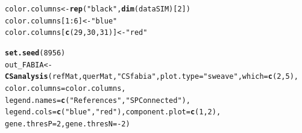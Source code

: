 \documentclass[a4paper]{article}\usepackage[]{graphicx}\usepackage[]{color}
\makeatletter
\newcommand{\hlnum}[1]{\textcolor[rgb]{0.686,0.059,0.569}{#1}}%
\newcommand{\hlstr}[1]{\textcolor[rgb]{0.192,0.494,0.8}{#1}}%
\newcommand{\hlopt}[1]{\textcolor[rgb]{0,0,0}{#1}}%
\newcommand{\hlstd}[1]{\textcolor[rgb]{0.345,0.345,0.345}{#1}}%
\newcommand{\hlkwb}[1]{\textcolor[rgb]{0.69,0.353,0.396}{#1}}%
\newcommand{\hlkwc}[1]{\textcolor[rgb]{0.333,0.667,0.333}{#1}}%
\newcommand{\hlkwd}[1]{\textcolor[rgb]{0.737,0.353,0.396}{\textbf{#1}}}%
\newenvironment{kframe}{%
 \def\at@end@of@kframe{}%
 \ifinner\ifhmode%
  \def\at@end@of@kframe{\end{minipage}}%
  \begin{minipage}{\columnwidth}%
 \fi\fi%
 \def\FrameCommand##1{\hskip\@totalleftmargin \hskip-\fboxsep
 \colorbox{shadecolor}{##1}\hskip-\fboxsep
     \hskip-\linewidth \hskip-\@totalleftmargin \hskip\columnwidth}%
 \MakeFramed {\advance\hsize-\width
   \@totalleftmargin\z@ \linewidth\hsize
   \@setminipage}}%
 {\par\unskip\endMakeFramed%
 \at@end@of@kframe}
\newenvironment{knitrout}{}{} %
\makeatother
\begin{document}
\begin{knitrout}
\color{fgcolor}\begin{kframe}
\begin{alltt}
        \hlstd{color.columns} \hlkwb{<-} \hlkwd{rep}\hlstd{(}\hlstr{"black"}\hlstd{,}\hlkwd{dim}\hlstd{(dataSIM)[}\hlnum{2}\hlstd{])}
        \hlstd{color.columns[}\hlnum{1}\hlopt{:}\hlnum{6}\hlstd{]} \hlkwb{<-} \hlstr{"blue"}
        \hlstd{color.columns[}\hlkwd{c}\hlstd{(}\hlnum{29}\hlstd{,}\hlnum{30}\hlstd{,}\hlnum{31}\hlstd{)]} \hlkwb{<-} \hlstr{"red"}

        \hlkwd{set.seed}\hlstd{(}\hlnum{8956}\hlstd{)}
        \hlstd{out_FABIA} \hlkwb{<-} \hlkwd{CSanalysis}\hlstd{(refMat,querMat,}\hlstr{"CSfabia"}\hlstd{,}\hlkwc{plot.type}\hlstd{=}\hlstr{"sweave"}\hlstd{,}\hlkwc{which}\hlstd{=}\hlkwd{c}\hlstd{(}\hlnum{2}\hlstd{,}\hlnum{5}\hlstd{),}
                        \hlkwc{color.columns}\hlstd{=color.columns,}
                        \hlkwc{legend.names}\hlstd{=}\hlkwd{c}\hlstd{(}\hlstr{"References"}\hlstd{,}\hlstr{"SP Connected"}\hlstd{),}
                        \hlkwc{legend.cols}\hlstd{=}\hlkwd{c}\hlstd{(}\hlstr{"blue"}\hlstd{,}\hlstr{"red"}\hlstd{),} \hlkwc{component.plot}\hlstd{=}\hlkwd{c}\hlstd{(}\hlnum{1}\hlstd{,}\hlnum{2}\hlstd{),}
                        \hlkwc{gene.thresP}\hlstd{=}\hlnum{2}\hlstd{,}\hlkwc{gene.thresN}\hlstd{=}\hlopt{-}\hlnum{2}\hlstd{)}
\end{alltt}
\end{kframe}\begin{figure}[H]


\end{figure}
\end{knitrout}
\end{document}
